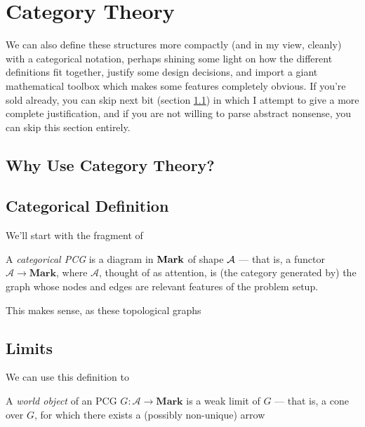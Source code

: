\documentclass{article}
\begin{document}
	\section{Category Theory}

	We can also define these structures more compactly (and in my view, cleanly) with a categorical notation, perhaps shining some light on how the different definitions fit together, justify some design decisions, and import a giant mathematical toolbox which makes some features completely obvious. If you're sold already, you can skip next bit (section \ref{sec:cat-defense}) in which I attempt to give a more complete justification, and if you are not willing to parse abstract nonsense, you can skip this section entirely.
	
	\subsection{Why Use Category Theory?}\label{sec:cat-defense}
	

	\subsection{Categorical Definition}\label{sec:cat-defs}
	We'll start with the fragment of 
	
	\begin{defn}
		A \emph{categorical PCG} is a diagram in $\bf Mark$ of shape $\cal A$ --- that is, a functor $\mathcal A \to \mathbf{Mark}$, where $\mathcal A$, thought of as attention, is (the category generated by) the graph whose nodes and edges are relevant features of the problem setup.
	\end{defn}
	
	This makes sense, as these topological graphs
	\subsection{Limits } \label{sec:cat-worlds}
	
	We can use this definition to 
	
	\begin{defn}
		A \emph{world object} of an PCG $G : \mathcal A \to \mathbf{Mark}$ is a weak limit of $G$ --- that is, a cone over $G$, for which there exists a (possibly non-unique) arrow 
	\end{defn}
\end{document}
